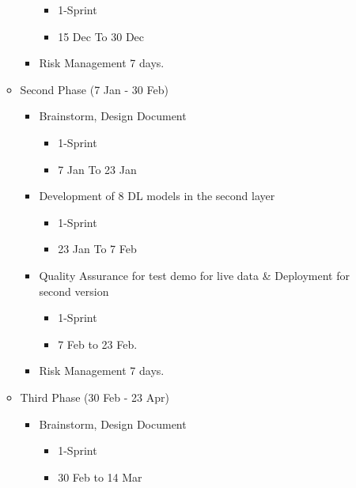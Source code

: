 \begin{itemize}
\begin{itemize}
\begin{itemize}
                    \begin{itemize}
                        \item 1-Sprint
                        \item 15 Dec To 30 Dec
                    \end{itemize}
                \item Risk Management 7 days.    
              \end{itemize}
            \item Second Phase (7 Jan - 30 Feb) 
               \begin{itemize}
                  \item Brainstorm, Design Document 
                    \begin{itemize}
                        \item 1-Sprint
                        \item 7 Jan To 23 Jan
                    \end{itemize}
                 \item Development of 8 DL models in the second layer
                    \begin{itemize}
                        \item 1-Sprint
                        \item 23 Jan To 7 Feb
                    \end{itemize}
                 \item Quality Assurance for test demo for live data \& Deployment for second version 
                    \begin{itemize}
                        \item 1-Sprint
                        \item 7 Feb to 23 Feb.
                    \end{itemize}
                 \item Risk Management 7 days.
                \end{itemize}
            \item Third Phase (30 Feb - 23 Apr)
               \begin{itemize}
                   \item Brainstorm, Design Document
                      \begin{itemize}
                          \item 1-Sprint
                        \item 30 Feb to 14 Mar
                      \end{itemize}

\end{itemize}
\end{itemize}
\end{itemize}
